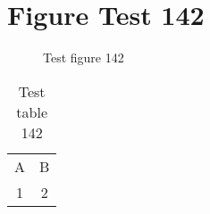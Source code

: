 \documentclass{article}
\begin{document}
\section{Figure Test 142}
\begin{figure}[h]
\caption{Test figure 142}
\end{figure}
\begin{table}[h]
\caption{Test table 142}
\begin{tabular}{cc}
A & B \\
1 & 2
\end{tabular}
\end{table}
\end{document}

